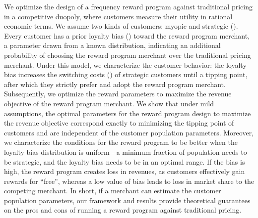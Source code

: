 We optimize the design of a frequency reward program against traditional pricing in a competitive duopoly, where customers measure their utility in rational economic terms.
We assume two kinds of customers: myopic and strategic (\cite{yilmaz2016upgrade}). 
Every customer has a prior loyalty bias (\cite{fader1993excess}) toward the reward program merchant, a parameter drawn from a known distribution, indicating an additional probability of choosing the reward program merchant over the traditional pricing merchant.
Under this model, we characterize the customer behavior: the loyalty bias increases the switching costs (\cite{klemperer1995competition}) of strategic customers until a tipping point, after which they strictly prefer and adopt the reward program merchant. 
Subsequently, we optimize the reward parameters to maximize the revenue objective of the reward program merchant.
We show that under mild assumptions, the optimal parameters for the reward program design to maximize the revenue objective correspond exactly to minimizing the tipping point of customers and are independent of the customer population parameters. 
Moreover, we characterize the conditions for the reward program to be better when the loyalty bias distribution is uniform - a minimum fraction of population needs to be strategic, and the loyalty bias needs to be in an optimal range.
If the bias is high, the reward program creates loss in revenues, as customers effectively gain rewards for ``free'', whereas a low value of bias leads to loss in market share to the competing merchant.
In short, if a merchant can estimate the customer population parameters, our framework and results provide theoretical guarantees on the pros and cons of running a reward program against traditional pricing.
